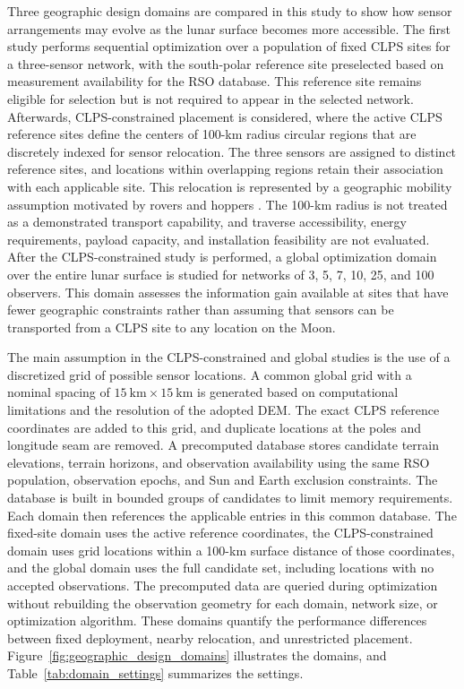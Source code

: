 Three geographic design domains are compared in this study to show how sensor arrangements may evolve as the lunar surface becomes more accessible. The first study performs sequential optimization over a population of fixed CLPS sites for a three-sensor network, with the south-polar reference site preselected based on measurement availability for the RSO database. This reference site remains eligible for selection but is not required to appear in the selected network. Afterwards, CLPS-constrained placement is considered, where the active CLPS reference sites define the centers of 100-km radius circular regions that are discretely indexed for sensor relocation. The three sensors are assigned to distinct reference sites, and locations within overlapping regions retain their association with each applicable site. This relocation is represented by a geographic mobility assumption motivated by rovers and hoppers \cite{NASAVIPER2025,NASAMicroNova2025}. The 100-km radius is not treated as a demonstrated transport capability, and traverse accessibility, energy requirements, payload capacity, and installation feasibility are not evaluated. After the CLPS-constrained study is performed, a global optimization domain over the entire lunar surface is studied for networks of 3, 5, 7, 10, 25, and 100 observers. This domain assesses the information gain available at sites that have fewer geographic constraints rather than assuming that sensors can be transported from a CLPS site to any location on the Moon.

The main assumption in the CLPS-constrained and global studies is the use of a discretized grid of possible sensor locations. A common global grid with a nominal spacing of $15~\mathrm{km}\times15~\mathrm{km}$ is generated based on computational limitations and the resolution of the adopted DEM. The exact CLPS reference coordinates are added to this grid, and duplicate locations at the poles and longitude seam are removed. A precomputed database stores candidate terrain elevations, terrain horizons, and observation availability using the same RSO population, observation epochs, and Sun and Earth exclusion constraints. The database is built in bounded groups of candidates to limit memory requirements. Each domain then references the applicable entries in this common database. The fixed-site domain uses the active reference coordinates, the CLPS-constrained domain uses grid locations within a 100-km surface distance of those coordinates, and the global domain uses the full candidate set, including locations with no accepted observations. The precomputed data are queried during optimization without rebuilding the observation geometry for each domain, network size, or optimization algorithm. These domains quantify the performance differences between fixed deployment, nearby relocation, and unrestricted placement. Figure~\ref{fig:geographic_design_domains} illustrates the domains, and Table~\ref{tab:domain_settings} summarizes the settings.


